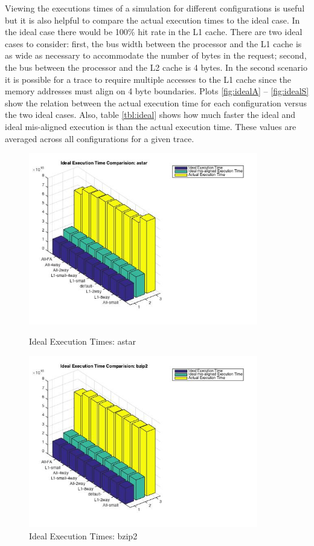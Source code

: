 \documentclass[11pt,titlepage]{article}
\begin{document}
    Viewing the executions times of a simulation for different configurations is useful but it is also helpful to compare the actual execution times to the ideal case. In the ideal case there would be 100\% hit rate in the L1 cache. There are two ideal cases to consider: first, the bus width between the processor and the L1 cache is as wide as necessary to accommodate the number of bytes in the request; second, the bus between the processor and the L2 cache is 4 bytes. In the second scenario it is possible for a trace to require multiple accesses to the L1 cache since the memory addresses must align on 4 byte boundaries. Plots \ref{fig:idealA} -- \ref{fig:idealS} show the relation between the actual execution time for each configuration versus the two ideal cases. Also, table \ref{tbl:ideal} shows how much faster the ideal and ideal mis-aligned execution is than the actual execution time. These values are averaged across all configurations for a given trace.
    \begin{figure}[H]
      \centering
      \begin{minipage}{.5\textwidth}
        \centering
        \includegraphics[width=10cm]{idealAstar}
        \caption{Ideal Execution Times: astar}
        \label{fig:idealA}
      \end{minipage}%
      \begin{minipage}{.5\textwidth}
        \centering
        \includegraphics[width=10cm]{idealBzip2}
        \caption{Ideal Execution Times: bzip2}
        \label{fig:idealB}
      \end{minipage}
    \end{figure}
\end{document}
